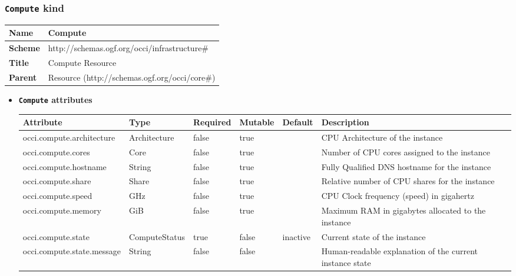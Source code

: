 \subsubsection{\texttt{Compute} kind}
\begin{center}
\begin{tabular}{|l|l|}
  \hline
  \textbf{Name} & Compute \\
  \hline  
  \textbf{Scheme} & http://schemas.ogf.org/occi/infrastructure\# \\
  \hline
  \textbf{Title} & Compute Resource \\
  \hline
  \textbf{Parent} & Resource (http://schemas.ogf.org/occi/core\#) \\
  \hline
\end{tabular}
\end{center}
\begin{itemize}
\item \textbf{\texttt{Compute} attributes}

\begin{tabularx}{\textwidth}{|l|l|p{1.4cm}|p{1.3cm}|l|X|}
  \hline
  \textbf{Attribute} & \textbf{Type} & \textbf{Required} & \textbf{Mutable} & \textbf{Default} & \textbf{Description} \\
  \hline  
  occi.compute.architecture & Architecture & false & true &  & CPU Architecture of the instance \\
  \hline
  occi.compute.cores & Core & false & true &  & Number of CPU cores assigned to the instance \\
  \hline
  occi.compute.hostname & String & false & true &  & Fully Qualified DNS hostname for the instance \\
  \hline
  occi.compute.share & Share & false & true &  & Relative number of CPU shares for the instance \\
  \hline
  occi.compute.speed & GHz & false & true &  & CPU Clock frequency (speed) in gigahertz \\
  \hline
  occi.compute.memory & GiB & false & true &  & Maximum RAM in gigabytes allocated to the instance \\
  \hline
  occi.compute.state & ComputeStatus & true & false & inactive & Current state of the instance \\
  \hline
  occi.compute.state.message & String & false & false &  & Human-readable explanation of the current instance state \\
  \hline
\end{tabularx}
\end{itemize}

